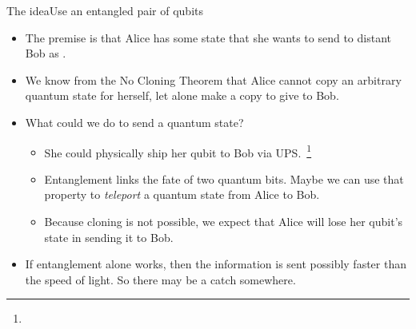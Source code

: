 \begin{frame}{The idea}{Use an entangled pair of qubits}

\begin{itemize}[<+->]
    \item The premise is that Alice has some state  that she wants to send to distant Bob as .
    \item We know from the No Cloning Theorem that Alice cannot copy an arbitrary quantum state for herself, let alone make a copy to give to Bob.
    \item What could we do to send a quantum state?
    \begin{itemize}
    \item She could physically ship her qubit to Bob via UPS.~\footnote{}
    \item Entanglement links the fate of two quantum bits.  Maybe we can use that property to \emph{teleport} a quantum state from Alice to Bob.
    \item Because cloning is not possible, we expect that Alice will lose her qubit's state in sending it to Bob.
    \end{itemize}
    \item If entanglement alone works, then the information is sent possibly faster than the speed of light.  So there may be a catch somewhere.
\end{itemize}

\end{frame}

